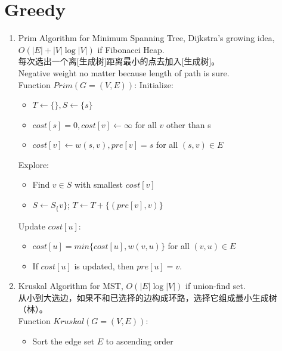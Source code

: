 \documentclass[10pt, a4paper, twocolumn]{article}
\begin{document}
\section{Greedy}
\begin{enumerate}[leftmargin = 12pt, topsep = 0pt, itemsep=0pt, partopsep = 0pt]
    \item Prim Algorithm for Minimum Spanning Tree, Dijkstra's        growing idea, $O(|E|+|V|\log|V|)$ if Fibonacci Heap.\\
        每次选出一个离[生成树]距离最小的点去加入[生成树]。\\
        Negative weight no matter because length of path is sure.\\
        Function $Prim(G=(V,E))$: Initialize:
        \begin{itemize}[leftmargin = 12pt, topsep = 0pt, itemsep=0pt, partopsep = 0pt]
        \item $T\leftarrow \{\},S\leftarrow \{s\}$
        \item $cost[s]=0, cost[v]\leftarrow \infty$ for all $v$ other than s
        \item $cost[v]\leftarrow w(s,v), pre[v]=s$ for all $(s,v)\in E$
        \end{itemize}
        Explore:
        \begin{itemize}[leftmargin = 12pt, topsep = 0pt, itemsep=0pt, partopsep = 0pt]
        \item Find $v\in S$ with smallest $cost[v]$
        \item $S\leftarrow S_\{v\}$; $T\leftarrow T+\{(pre[v],v)\}$
        \end{itemize}
        Update $cost[u]$:
        \begin{itemize}[leftmargin = 12pt, topsep = 0pt, itemsep=0pt, partopsep = 0pt]
        \item $cost[u]=min\{cost[u],w(v,u)\}$ for all $(v,u)\in E$
        \item If $cost[u]$ is updated, then $pre[u]=v$.
        \end{itemize}
    \item Kruskal Algorithm for MST, $O(|E|\log|V|)$ if union-find       set.\\
        从小到大选边，如果不和已选择的边构成环路，选择它组成最小生成树（林）。\\
        Function $Kruskal(G=(V,E))$:
        \begin{itemize}[leftmargin = 12pt, topsep = 0pt, itemsep=0pt, partopsep = 0pt]
        \item Sort the edge set $E$ to ascending order

\end{itemize}
\end{enumerate}
\end{document}
